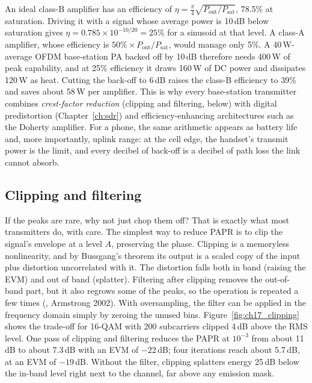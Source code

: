 \begin{worked}
An ideal class-B amplifier has an efficiency of $\eta=\frac\pi4\sqrt{P_{\text{out}}/P_{\text{sat}}}$, 78.5\% at saturation.
Driving it with a signal whose average power is 10\,dB below saturation gives
$\eta=0.785\times10^{-10/20}=25\%$ for a sinusoid at that level. A class-A amplifier, whose efficiency is
$50\%\times P_{\text{out}}/P_{\text{sat}}$, would manage only 5\%. A 40\,W-average OFDM base-station PA backed
off by 10\,dB therefore needs 400\,W of peak capability, and at 25\% efficiency it draws 160\,W of DC power and
dissipates 120\,W as heat. Cutting the back-off to 6\,dB raises the class-B efficiency to 39\% and saves about
58\,W per amplifier. This is why every base-station transmitter combines \emph{crest-factor reduction}
(clipping and filtering, below) with digital predistortion (Chapter~\ref{ch:sdr}) and efficiency-enhancing
architectures such as the Doherty amplifier. For a phone, the same arithmetic appears as battery life and,
more importantly, uplink range: at the cell edge, the handset's transmit power is the limit, and every decibel
of back-off is a decibel of path loss the link cannot absorb.
\end{worked}

\subsection{Clipping and filtering}

If the peaks are rare, why not just chop them off? That is exactly what most transmitters do, with
care. The simplest way to reduce PAPR is to clip the signal's envelope at a level $A$, preserving the phase. Clipping
is a memoryless nonlinearity, and by Bussgang's theorem its output is a scaled copy of the input plus distortion
uncorrelated with it. The distortion falls both in band (raising the EVM) and out of band (splatter).
Filtering after clipping removes the out-of-band part, but it also regrows some of the peaks, so the
operation is repeated a few times (, Armstrong 2002). With
oversampling, the filter can be applied in the frequency domain simply by zeroing the unused bins.
Figure~\ref{fig:ch17_clipping} shows the trade-off for 16-QAM with 200 subcarriers clipped 4\,dB above the RMS
level. One pass of clipping and filtering reduces the PAPR at $10^{-3}$ from about 11\,dB to about 7.3\,dB with an
EVM of $-22$\,dB; four iterations reach about 5.7\,dB, at an EVM of $-19$\,dB. Without the filter, clipping splatters
energy 25\,dB below the in-band level right next to the channel, far above any emission mask.

